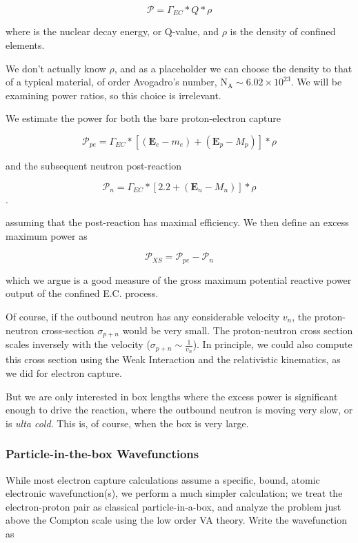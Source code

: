 \documentclass[%
 aip,
 jmp,%
 amsmath,amssymb,
 reprint,%
]{revtex4-1}
\begin{document}
$$\mathcal{P}=\Gamma_{EC}*Q*\rho$$

where is the nuclear decay energy, or Q-value, and $\rho$ is the  density of confined elements.  

We don't actually know $\rho$, and as a placeholder we can choose the density to that of a typical material, of order Avogadro's number, $\mathrm{N_{A}}\sim6.02\times10^{23}$.  We will be examining power ratios, so this choice is irrelevant.

We estimate the power for both the bare proton-electron capture

$$\mathcal{P}_{pe}=\Gamma_{EC}*\left[(\mathbf{E}_{e}-m_{e})+(\mathbf{E}_{p}-M_{p})\right]*\rho$$

and the subsequent neutron post-reaction

$$\mathcal{P}_{n}=\Gamma_{EC}*\left[2.2+(\mathbf{E}_{n}-M_{n})\right]*\rho$$.

assuming that the post-reaction has maximal efficiency.  We then define an excess maximum power as

$$\mathcal{P}_{XS}=\mathcal{P}_{pe}-\mathcal{P}_{n}$$

which we argue is a good measure of the gross maximum potential reactive power output of the confined E.C. process. 

Of course, if the outbound neutron has any considerable velocity $v_{n}$, the proton-neutron cross-section $\sigma_{p+n}$ would be very small.  The proton-neutron cross section scales inversely with the velocity ($\sigma_{p+n}\sim\frac{1}{v_{n}}$).  In principle, we could also compute this cross section using the Weak Interaction and the relativistic kinematics, as we did for electron capture.  

But we are only interested in box lengths where the excess power is significant enough to drive the reaction, where the outbound neutron is moving very slow, or is \emph{ulta cold}.  This is, of course, when the box is very large.

\subsubsection{Particle-in-the-box Wavefunctions}

While most electron capture calculations assume a specific, bound, atomic electronic wavefunction(s), we perform a much simpler calculation; we treat the electron-proton pair as classical particle-in-a-box,  and analyze the problem just above the Compton scale using the low order VA theory.  Write the wavefunction as
\end{document}
